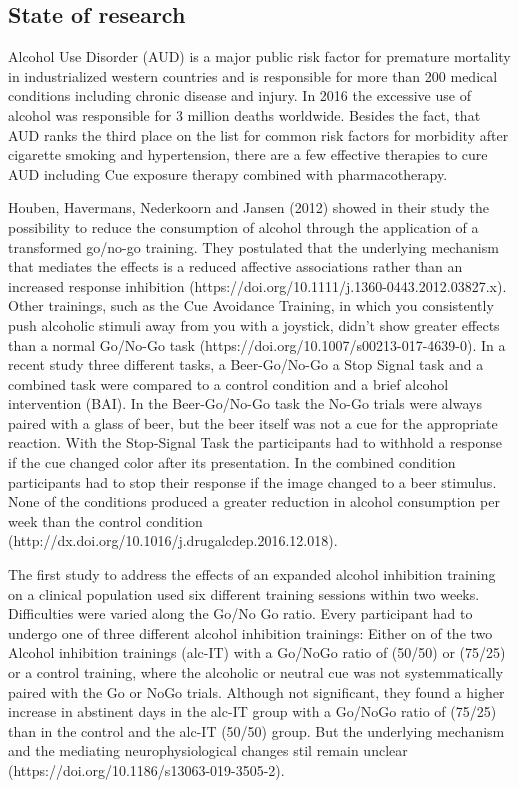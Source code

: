 \documentclass[12pt]{article}
\begin{document}
\subsection{State of research}
Alcohol Use Disorder (AUD) is a major public risk factor for premature mortality in industrialized western countries and is responsible for more than 200 medical conditions including chronic disease and injury. In 2016 the excessive use of alcohol was responsible for 3 million deaths worldwide. Besides the fact, that AUD ranks the third place on the list for common risk factors for morbidity after cigarette smoking and hypertension, there are a few effective therapies to cure AUD including Cue exposure therapy combined with pharmacotherapy. 

Houben, Havermans, Nederkoorn and Jansen (2012) showed in their study the possibility to reduce the consumption of alcohol through the application of a transformed go/no-go training. They postulated that the underlying mechanism that mediates the effects is a reduced affective associations rather than an increased response inhibition (https://doi.org/10.1111/j.1360-0443.2012.03827.x). Other trainings, such as the Cue Avoidance Training, in which you consistently push alcoholic stimuli away from you with a joystick, didn’t show greater effects than a normal Go/No-Go task (https://doi.org/10.1007/s00213-017-4639-0). In a recent study three different tasks, a Beer-Go/No-Go a Stop Signal task and a combined task were compared to a control condition and a brief alcohol intervention (BAI). In the Beer-Go/No-Go task the No-Go trials were always paired with a glass of beer, but the beer itself was not a cue for the appropriate reaction. With the Stop-Signal Task the participants had to withhold a response if the cue changed color after its presentation. In the combined condition participants had to stop their response if the image changed to a beer stimulus. None of the conditions produced a greater reduction in alcohol consumption per week than the control condition (http://dx.doi.org/10.1016/j.drugalcdep.2016.12.018). 

The first study to address the effects of an expanded alcohol inhibition training on a clinical population used six different training sessions within two weeks. Difficulties were varied along the Go/No Go ratio. Every participant had to undergo one of three different alcohol inhibition trainings: Either on of the two Alcohol inhibition trainings (alc-IT) with a Go/NoGo ratio of (50/50) or (75/25) or a control training, where the alcoholic or neutral cue was not systemmatically paired with the Go or NoGo trials. Although not significant, they found a higher increase in abstinent days in the alc-IT group with a Go/NoGo ratio of (75/25) than in the control and the alc-IT (50/50) group. But the underlying mechanism and the mediating neurophysiological changes stil remain unclear (https://doi.org/10.1186/s13063-019-3505-2).
\end{document}

